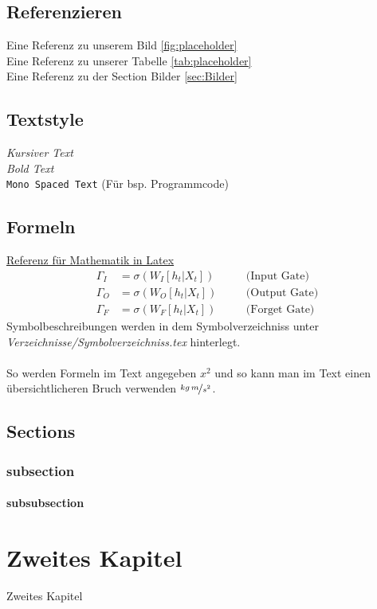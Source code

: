 \section{Referenzieren}
\label{sec:Referenzieren}
%
Eine Referenz zu unserem Bild \ref{fig:placeholder}\\
Eine Referenz zu unserer Tabelle \ref{tab:placeholder}\\
Eine Referenz zu der Section Bilder \ref{sec:Bilder}
%
%
\section{Textstyle}
\label{sec:Textstyle}
%
\textit{Kursiver Text}\\
\textit{Bold Text}\\
\texttt{Mono Spaced Text} (Für bsp. Programmcode)
%
%
\section{Formeln}
\label{sec:Formeln}
%
\href{https://en.wikibooks.org/wiki/LaTeX/Mathematics}{Referenz für Mathematik in Latex}
%
\begin{align}
	\label{eq:input_gate}
	\Gamma_I &= \sigma\left(W_{I}\left[h_t|X_t\right]\right)&&\quad\text{(Input Gate)}\\
	\label{eq:output_gate}
	\Gamma_O &= \sigma\left(W_{O}\left[h_t|X_t\right]\right)&&\quad\text{(Output Gate)}\\
	\label{eq:forget_gate}
	\Gamma_F &= \sigma\left(W_{F}\left[h_t|X_t\right]\right)&&\quad\text{(Forget Gate)}
\end{align}
%
Symbolbeschreibungen werden in dem Symbolverzeichniss unter \textit{Verzeichnisse/Symbolverzeichniss.tex} hinterlegt.\\\\
%
So werden Formeln im Text angegeben $x^2$ und so kann man im Text einen übersichtlicheren Bruch verwenden $\nicefrac{kg\,m}{s^2}$.
%
%
\section{Sections}
\label{sec:sections}
%
\subsection{subsection}
\label{subsec:subsection}
%
\subsubsection{subsubsection}
\label{subsubsec:subsubsection}
%
%
\chapter{Zweites Kapitel}
\label{chap:Zweites Kapitel}
%
Zweites Kapitel
%
%